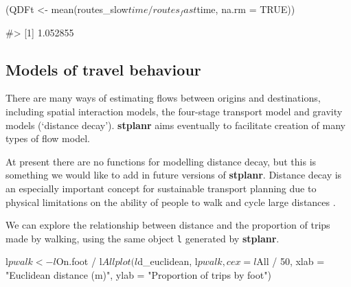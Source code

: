 \begin{Schunk}
\begin{Sinput}
(QDFt <- mean(routes_slow$time / routes_fast$time, na.rm = TRUE))
\end{Sinput}
\begin{Soutput}
#> [1] 1.052855
\end{Soutput}
\end{Schunk}

\subsection{Models of travel
behaviour}\label{models-of-travel-behaviour}

There are many ways of estimating flows between origins and
destinations, including spatial interaction models, the four-stage
transport model and gravity models (`distance decay'). \textbf{stplanr}
aims eventually to facilitate creation of many types of flow model.

At present there are no functions for modelling distance decay, but this
is something we would like to add in future versions of
\textbf{stplanr}. Distance decay is an especially important concept for
sustainable transport planning due to physical limitations on the
ability of people to walk and cycle large distances
\citep{iacono_measuring_2010}.

We can explore the relationship between distance and the proportion of
trips made by walking, using the same object \texttt{l} generated by
\textbf{stplanr}.

\begin{Schunk}
\begin{Sinput}
l$pwalk <- l$On.foot / l$All
plot(l$d_euclidean, l$pwalk, cex = l$All / 50,
  xlab = "Euclidean distance (m)", ylab = "Proportion of trips by foot")
\end{Sinput}
\end{Schunk}

